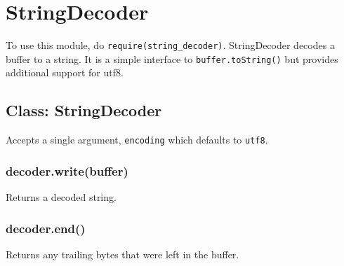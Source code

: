 \section{StringDecoder}\label{stringdecoder}

\begin{Shaded}
\begin{Highlighting}[]
 
\end{Highlighting}
\end{Shaded}

To use this module, do
\texttt{require(\textquotesingle{}string\_decoder\textquotesingle{})}.
StringDecoder decodes a buffer to a string. It is a simple interface to
\texttt{buffer.toString()} but provides additional support for utf8.

\begin{Shaded}
\begin{Highlighting}[]
 \NormalTok{(}\NormalTok{;}
  \NormalTok{(}\NormalTok{);}

  \NormalTok{([}\NormalTok{, }\NormalTok{]);}
\NormalTok{(}

  \NormalTok{([}\NormalTok{, }\NormalTok{, }\NormalTok{]);}
\NormalTok{(}
\end{Highlighting}
\end{Shaded}

\subsection{Class: StringDecoder}\label{class-stringdecoder}

Accepts a single argument, \texttt{encoding} which defaults to
\texttt{utf8}.

\subsubsection{decoder.write(buffer)}\label{decoder.writebuffer}

Returns a decoded string.

\subsubsection{decoder.end()}\label{decoder.end}

Returns any trailing bytes that were left in the buffer.
